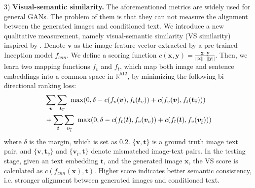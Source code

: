\documentclass[10pt,twocolumn,letterpaper]{article}
\begin{document}
3) \textbf{Visual-semantic similarity.} The aforementioned metrics are widely used for general GANs. The problem of them is that they can not measure the alignment between the generated images and conditioned text. We introduce a new qualitative measurement, namely visual-semantic similarity (VS similarity) inspired by \cite{vsemb}. Denote $\bm{v}$ as the image feature vector extracted by a pre-trained Inception model $f_{cnn}$\cite{inception}.
We define a scoring function $c(\bm{x}, \bm{y})=\frac{\bm{x}\cdot \bm{y}}{||\bm{x}||\cdot ||\bm{y}||}$. 
Then, we learn two mapping functions $f_v$ and $f_t$, which map both image and sentence embeddings into a common space in $\mathbb{R}^{512}$, by minimizing the following bi-directional ranking loss:
\begin{equation}\vspace{-.2cm}
\begin{split}
 & \sum_{ \bm{v} }\sum_{ \bm{t}_{\overline{v}} }~\max( 0, \delta  - c(f_v(\bm{v}), f_t( \bm{t}_{{v}}) )+ c(f_v(\bm{v}), f_t( \bm{t}_{\overline{v}}) )     ) \\
 & + \sum_{ \bm{t} }\sum_{ \bm{v}_{\overline{t}} }~\max( 0,  \delta  - c(f_t(\bm{t}), f_v( \bm{v}_{{v}} )) +  c(f_t(\bm{t}), f_v( \bm{v}_{\overline{t}} ))  )
\end{split}
\vspace{-.2cm}
\end{equation}
where $\delta$ is the margin, which is set as 0.2. $\{\bm{v}, \bm{t}\}$ is a ground truth image text pair, and $\{\bm v, \bm t_{\overline{v}} \}$ and $\{ \bm v_{\overline{t}}, \bm{t} \}$ denote mismatched image-text pairs. In the testing stage, given an text embedding $\bm{t}$, and the generated image $\bm{x}$, the VS score is calculated as $c(f_{cnn}(\bm{x}), \bm{t})$. Higher score indicates better semantic consistency, i.e. stronger alignment between generated images and conditioned text.
\end{document}
